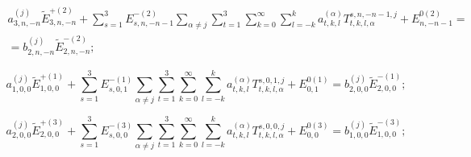 \begin{multline}
a_{3,n,-n}^{(j)}{\tilde E}_{3,n,-n}^{+(2)}+\sum_{s=1}^3 E_{s,n,-n-1}^{-(2)}\sum _{\alpha\neq j} \sum _{t=1}^3 \sum _{k=0}^{\infty}\sum_{l=-k}^k a_{t,k,l}^{(\alpha)} T_{t,k,l,\alpha}^{s,n,-n-1,j}+E_{n,-n-1}^{0(2)}= \\
=b_{2,n,-n}^{(j)}{\tilde E}_{2,n,-n}^{-(2)};
\label{eq:13:7b}
\end{multline}

\begin{equation}
a_{1,0,0}^{(j)}{\tilde E}_{1,0,0}^{+(1)}+\sum_{s=1}^3 E_{s,0,1}^{-(1)}\sum _{\alpha\neq j} \sum _{t=1}^3 \sum _{k=0}^{\infty}\sum_{l=-k}^k a_{t,k,l}^{(\alpha)} T_{t,k,l,\alpha}^{s,0,1,j}+E_{0,1}^{0(1)}=b_{2,0,0}^{(j)}{\tilde E}_{2,0,0}^{-(1)};
\label{eq:13:8b}
\end{equation}

\begin{equation}
a_{2,0,0}^{(j)}{\tilde E}_{2,0,0}^{+(3)}+\sum_{s=1}^3 E_{s,0,0}^{-(3)}\sum _{\alpha\neq j} \sum _{t=1}^3 \sum _{k=0}^{\infty}\sum_{l=-k}^k a_{t,k,l}^{(\alpha)} T_{t,k,l,\alpha}^{s,0,0,j}+E_{0,0}^{0(3)}=b_{1,0,0}^{(j)}{\tilde E}_{1,0,0}^{-(3)};
\label{eq:13:9b}
\end{equation}

